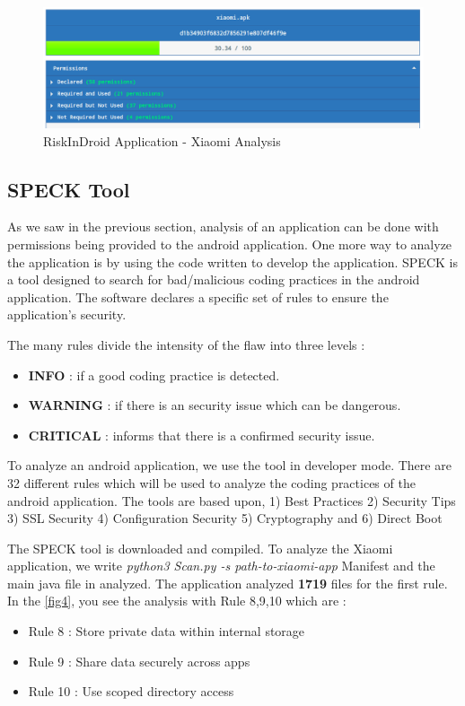 \documentclass[runningheads]{llncs}
\begin{document}
\begin{figure}
    \includegraphics[width=\textwidth]{images/xiaomi-riskinDroid.png}
    \caption{RiskInDroid Application - Xiaomi Analysis} \label{fig3}
\end{figure}


\subsection{SPECK Tool}
As we saw in the previous section, analysis of an application can be done with permissions being provided to the android application. One more way to analyze the application is by using the code written to develop the application.
SPECK is a tool designed to search for bad/malicious coding practices in the android application. The software declares a specific set of rules to ensure the application's security. 

The many rules divide the intensity of the flaw into three levels : 
\begin{itemize}
    \item \textbf{INFO} : if a good coding practice is detected.
    \item \textbf{WARNING} : if there is an security issue which can be dangerous.
    \item \textbf{CRITICAL} : informs that there is a confirmed security issue.
\end{itemize}

To analyze an android application, we use the tool in developer mode. There are 32 different rules which will be used to analyze the coding practices of the android application.
The tools are based upon, 1) Best Practices 2) Security Tips 3) SSL Security 4) Configuration Security 5) Cryptography and 6) Direct Boot

The SPECK tool is downloaded and compiled. To analyze the Xiaomi application, we write \textit{python3 Scan.py -s path-to-xiaomi-app}
Manifest and the main java file in analyzed. The application analyzed \textbf{1719} files for the first rule.
In the \ref{fig4}, you see the analysis with Rule 8,9,10 which are : 
\begin{itemize}
    \item Rule 8 : Store private data within internal storage
    \item Rule 9 : Share data securely across apps
    \item Rule 10 : Use scoped directory access
\end{itemize}
\end{document}
